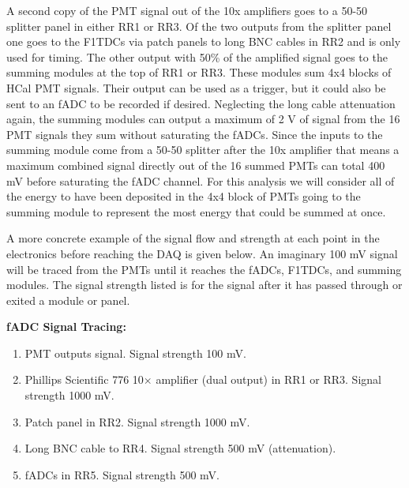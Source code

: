 \documentclass[10pt]{article}
\begin{document}
	A second copy of the PMT signal out of the 10x amplifiers goes to a 50-50 splitter panel in either RR1 or RR3. Of the two outputs from the splitter panel one goes to the F1TDCs via patch panels to long BNC cables in RR2 and is only used for timing. The other output with 50\% of the amplified signal goes to the summing modules at the top of RR1 or RR3. These modules sum 4x4 blocks of HCal PMT signals. Their output can be used as a trigger, but it could also be sent to an fADC to be recorded if desired. Neglecting the long cable attenuation again, the summing modules can output a maximum of 2 V of signal from the 16 PMT signals they sum without saturating the fADCs. Since the inputs to the summing module come from a 50-50 splitter after the 10x amplifier that means a maximum combined signal directly out of the 16 summed PMTs can total 400 mV before saturating the fADC channel. For this analysis we will consider all of the energy to have been deposited in the 4x4 block of PMTs going to the summing module to represent the most energy that could be summed at once. 
\vspace{3mm}
	
	A more concrete example of the signal flow and strength at each point in the electronics before reaching the DAQ is given below. An imaginary 100 mV signal will be traced from the PMTs until it reaches the fADCs, F1TDCs, and summing modules. The signal strength listed is for the signal after it has passed through or exited a module or panel. 
\vspace{3mm}
	
	\noindent \textbf{fADC Signal Tracing:}
	\begin{enumerate}
		\item PMT outputs signal. Signal strength 100 mV.
		\item Phillips Scientific 776 10$\times$ amplifier (dual output) in RR1 or RR3. Signal strength 1000 mV.
		\item Patch panel in RR2. Signal strength 1000 mV.
		\item Long BNC cable to RR4. Signal strength 500 mV (attenuation).
		\item fADCs in RR5. Signal strength 500 mV.
	\end{enumerate}
	
\end{document}
